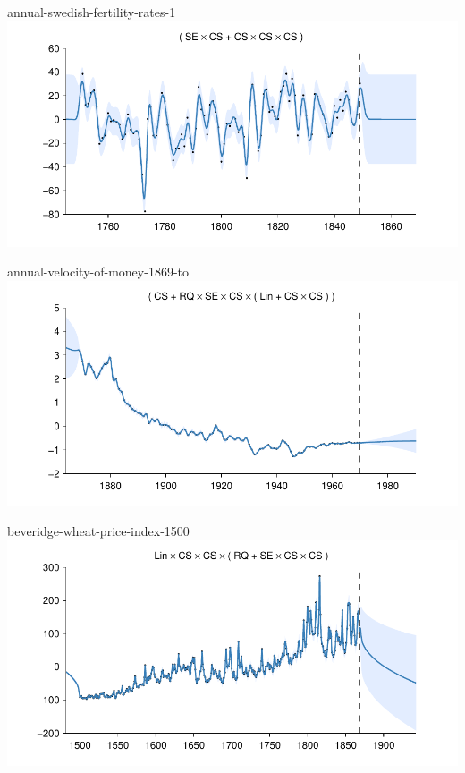     
\begin{frame}{annual-swedish-fertility-rates-1}
  \center
  \includegraphics[width=1.0\textwidth]{figures/annual-swedish-fertility-rates-1/annual-swedish-fertility-rates-1_all}
\end{frame}  


    
\begin{frame}{annual-velocity-of-money-1869-to}
  \center
  \includegraphics[width=1.0\textwidth]{figures/annual-velocity-of-money-1869-to/annual-velocity-of-money-1869-to_all}
\end{frame}  


    
\begin{frame}{beveridge-wheat-price-index-1500}
  \center
  \includegraphics[width=1.0\textwidth]{figures/beveridge-wheat-price-index-1500/beveridge-wheat-price-index-1500_all}
\end{frame}  


